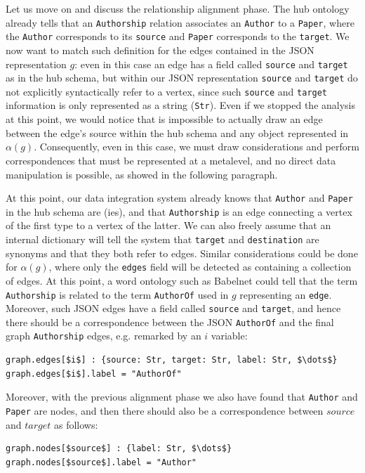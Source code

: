 \begin{example}[label=ex:examplegraphdata]
Let us move on and discuss the relationship alignment phase. %
The hub ontology already tells that an \texttt{Authorship} relation associates an \texttt{Author} to a \texttt{Paper}, where the \texttt{Author}  corresponds to its \texttt{source} and \texttt{Paper} corresponds to the \texttt{target}. We now want to match such definition for the edges contained in the JSON representation $g$: even in this case an edge has a field called \texttt{source} and \texttt{target} as in the hub schema, but within our JSON representation \texttt{source} and \texttt{target} do not explicitly syntactically refer to a vertex, since such \texttt{source} and \texttt{target} information is only represented as a string (\texttt{Str}). Even if we stopped the analysis at this point, we would notice that is impossible to actually draw an edge between the edge's source within the hub schema and any object represented in $\alpha(g)$. Consequently, even in this case, we must draw considerations and perform correspondences that must be represented at a metalevel, and no direct data manipulation is possible, as showed in the following paragraph.

At this point, our data integration system already knows that \texttt{Author} and \texttt{Paper} in the hub schema are \ONTA(ies), and that \texttt{Authorship} is an edge connecting a vertex of the first type to a vertex of the latter. We can also freely assume that an internal dictionary will tell the system that \texttt{target} and \texttt{destination} are synonyms and that they both refer to edges. Similar considerations could be done for $\alpha(g)$, where only the \texttt{edges} field will be detected as containing a collection of edges. At this point, a word ontology such as Babelnet \cite{Navigli12} could tell that the term \texttt{Authorship} is related to the term \texttt{AuthorOf} used in $g$ representing an \texttt{edge}. Moreover, such JSON edges have a field called \texttt{source} and \texttt{target}, and hence there should be a correspondence between the JSON \texttt{AuthorOf} and the final graph \texttt{Authorship} edges, e.g. remarked by an $i$ variable:
\begin{lstlisting}[language=theoryjson,basicstyle=\ttfamily\small,mathescape=true]
graph.edges[$i$] : {source: Str, target: Str, label: Str, $\dots$}
graph.edges[$i$].label = "AuthorOf"
\end{lstlisting}
Moreover, with the previous alignment phase we also have found that \texttt{Author} and \texttt{Paper} are nodes, and then there should also be a correspondence between $source$ and $target$ as follows:
\begin{lstlisting}[language=theoryjson,basicstyle=\ttfamily\small,mathescape=true]
graph.nodes[$source$] : {label: Str, $\dots$}
graph.nodes[$source$].label = "Author"


\end{lstlisting}
\end{example}
